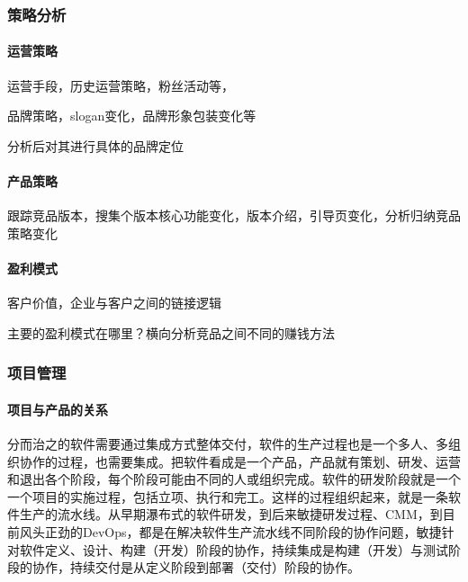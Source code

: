 \documentclass[letterpaper,11pt,english]{sphinxmanual}
\begin{document}
\subsubsection{策略分析}
\label{\detokenize{chapter_knowledge/strategy_analysis:id1}}\label{\detokenize{chapter_knowledge/strategy_analysis::doc}}

\paragraph{运营策略}
\label{\detokenize{chapter_knowledge/strategy_analysis:id2}}
运营手段，历史运营策略，粉丝活动等，

品牌策略，slogan变化，品牌形象包装变化等

分析后对其进行具体的品牌定位


\paragraph{产品策略}
\label{\detokenize{chapter_knowledge/strategy_analysis:id3}}
跟踪竞品版本，搜集个版本核心功能变化，版本介绍，引导页变化，分析归纳竞品策略变化


\paragraph{盈利模式}
\label{\detokenize{chapter_knowledge/strategy_analysis:id4}}
客户价值，企业与客户之间的链接逻辑

主要的盈利模式在哪里？横向分析竞品之间不同的赚钱方法


\subsubsection{项目管理}
\label{\detokenize{chapter_knowledge/project_manage:id1}}\label{\detokenize{chapter_knowledge/project_manage::doc}}

\paragraph{项目与产品的关系}
\label{\detokenize{chapter_knowledge/project_manage:id2}}
分而治之的软件需要通过集成方式整体交付，软件的生产过程也是一个多人、多组织协作的过程，也需要集成。把软件看成是一个产品，产品就有策划、研发、运营和退出各个阶段，每个阶段可能由不同的人或组织完成。软件的研发阶段就是一个一个项目的实施过程，包括立项、执行和完工。这样的过程组织起来，就是一条软件生产的流水线。从早期瀑布式的软件研发，到后来敏捷研发过程、CMM，到目前风头正劲的DevOps，都是在解决软件生产流水线不同阶段的协作问题，敏捷针对软件定义、设计、构建（开发）阶段的协作，持续集成是构建（开发）与测试阶段的协作，持续交付是从定义阶段到部署（交付）阶段的协作。
\end{document}
